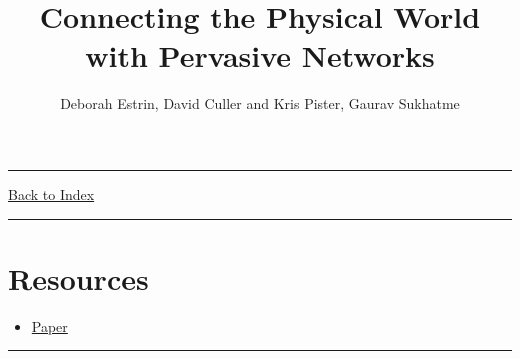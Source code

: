 \documentclass[letterpaper,10pt]{article}
\title{\textbf{Connecting the Physical World with Pervasive Networks}}
\author{Deborah Estrin, David Culler and Kris Pister, Gaurav Sukhatme}
\newcommand{\panhline}{\begin{center}\rule{\textwidth}{1pt}\end{center}}
\begin{document}
\maketitle

\panhline
\href{../index.html}{Back to Index}

\panhline
\tableofcontents

\section*{Resources}

\begin{itemize}
	\item \href{../../Readings/Connecting the Physical World with Pervasive Networks.pdf}{Paper}
\end{itemize}

\panhline


	
\end{document}
